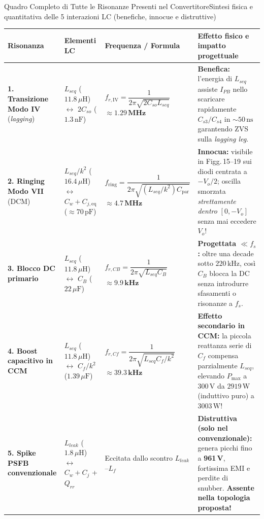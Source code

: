 \documentclass[aspectratio=169,9pt]{beamer}
\newcommand{\W}{\,\text{W}}
\newcommand{\kHz}{\,\text{kHz}}
\newcommand{\MHz}{\,\text{MHz}}
\newcommand{\uH}{\,\mu\text{H}}
\newcommand{\uF}{\,\mu\text{F}}
\newcommand{\pF}{\,\text{pF}}
\newcommand{\nF}{\,\text{nF}}
\newcommand{\ns}{\,\text{ns}}
\begin{document}
\begin{frame}{Quadro Completo di Tutte le Risonanze Presenti nel Convertitore}{Sintesi fisica e quantitativa delle 5 interazioni LC (benefiche, innocue e distruttive)}
  \scriptsize
  \setlength{\tabcolsep}{3.5pt}
  \renewcommand{\arraystretch}{1.18}
  \begin{tabular}{@{}>{\raggedright\arraybackslash}p{2.30cm}>{\raggedright\arraybackslash}p{2.25cm}>{\raggedright\arraybackslash}p{3.05cm}>{\raggedright\arraybackslash}p{6.25cm}@{}}
    \toprule
    \textbf{Risonanza} & \textbf{Elementi LC} & \textbf{Frequenza / Formula} & \textbf{Effetto fisico e impatto progettuale} \\
    \midrule
    \textbf{1. Transizione Modo IV} (\emph{lagging}) & $L_{seq}$ ($11.8\uH$) $\leftrightarrow$ $2C_{so}$ ($1.3\nF$) & $f_{r,\text{IV}} = \dfrac{1}{2\pi\sqrt{2C_{so}L_{seq}}}$\newline$\approx \mathbf{1.29\MHz}$ & \textbf{\color{GoodGreen}Benefica:} l'energia di $L_{seq}$ assiste $I_{PB}$ nello scaricare rapidamente $C_{s3}/C_{s4}$ in $\sim 50\ns$ garantendo ZVS sulla \emph{lagging leg}. \\
    \textbf{2. Ringing Modo VII} (DCM) & $L_{seq}/k^2$ ($16.4\uH$) $\leftrightarrow$ $C_w + C_{j,\text{eq}}$ ($\approx 70\pF$) & $f_{\text{ring}} = \dfrac{1}{2\pi\sqrt{(L_{seq}/k^2)C_{\text{par}}}}$\newline$\approx \mathbf{4.7\MHz}$ & \textbf{\color{AccentBlue}Innocua:} visibile in Figg.\,15--19 sui diodi centrata a $-V_o/2$; oscilla smorzata \emph{strettamente dentro} $[0, -V_o]$ senza mai eccedere $V_o$! \\
    \textbf{3. Blocco DC primario} & $L_{seq}$ ($11.8\uH$) $\leftrightarrow$ $C_B$ ($22\uF$) & $f_{r,CB} = \dfrac{1}{2\pi\sqrt{L_{seq}C_B}}$\newline$\approx \mathbf{9.9\kHz}$ & \textbf{\color{GoodGreen}Progettata $\ll f_s$:} oltre una decade sotto $220\kHz$, cos\`i $C_B$ blocca la DC senza introdurre sfasamenti o risonanze a $f_s$. \\
    \textbf{4. Boost capacitivo in CCM} & $L_{seq}$ ($11.8\uH$) $\leftrightarrow$ $C_f/k^2$ ($1.39\uF$) & $f_{r,Cf} = \dfrac{1}{2\pi\sqrt{L_{seq}C_f/k^2}}$\newline$\approx \mathbf{39.3\kHz}$ & \textbf{\color{WarnAmber}Effetto secondario in CCM:} la piccola reattanza serie di $C_f$ compensa parzialmente $L_{seq}$, elevando $P_{\max}$ a 300\,V da $2919\W$ (induttivo puro) a $3003\W$! \\
    \textbf{5. Spike PSFB convenzionale} & $L_{leak}$ ($1.8\uH$) $\leftrightarrow$ $C_w+C_j$ + $Q_{rr}$ & Eccitata dallo scontro $L_{leak}$--$L_f$ & \textbf{\color{AlertRed}Distruttiva (solo nel convenzionale):} genera picchi fino a \textbf{961\,V}, fortissima EMI e perdite di snubber. \textbf{Assente nella topologia proposta!} \\
    \bottomrule
  \end{tabular}
\end{frame}
\end{document}
